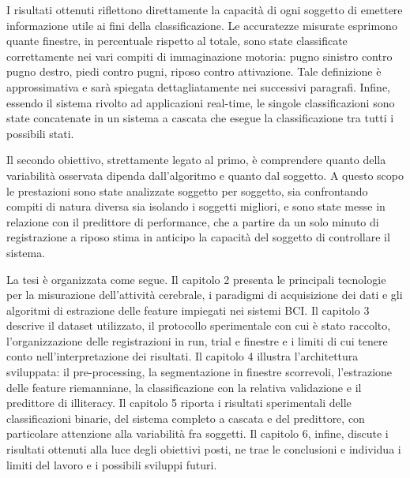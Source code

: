 I risultati ottenuti riflettono direttamente la capacità di ogni soggetto di emettere informazione utile ai fini della classificazione. Le accuratezze misurate esprimono quante finestre, in percentuale rispetto al totale, sono state classificate correttamente nei vari compiti di immaginazione motoria: pugno sinistro contro pugno destro, piedi contro pugni, riposo contro attivazione. Tale definizione è approssimativa e sarà spiegata dettagliatamente nei successivi paragrafi. Infine, essendo il sistema rivolto ad applicazioni real-time, le singole classificazioni sono state concatenate in un sistema a cascata che esegue la classificazione tra tutti i possibili stati.

Il secondo obiettivo, strettamente legato al primo, è comprendere quanto della variabilità osservata dipenda dall'algoritmo e quanto dal soggetto. A questo scopo le prestazioni sono state analizzate soggetto per soggetto, sia confrontando compiti di natura diversa sia isolando i soggetti migliori, e sono state messe in relazione con il predittore di performance, che a partire da un solo minuto di registrazione a riposo stima in anticipo la capacità del soggetto di controllare il sistema.

La tesi è organizzata come segue. Il capitolo 2 presenta le principali tecnologie per la misurazione dell'attività cerebrale, i paradigmi di acquisizione dei dati e gli algoritmi di estrazione delle feature impiegati nei sistemi BCI. Il capitolo 3 descrive il dataset utilizzato, il protocollo sperimentale con cui è stato raccolto, l'organizzazione delle registrazioni in run, trial e finestre e i limiti di cui tenere conto nell'interpretazione dei risultati. Il capitolo 4 illustra l'architettura sviluppata: il pre-processing, la segmentazione in finestre scorrevoli, l'estrazione delle feature riemanniane, la classificazione con la relativa validazione e il predittore di illiteracy. Il capitolo 5 riporta i risultati sperimentali delle classificazioni binarie, del sistema completo a cascata e del predittore, con particolare attenzione alla variabilità fra soggetti. Il capitolo 6, infine, discute i risultati ottenuti alla luce degli obiettivi posti, ne trae le conclusioni e individua i limiti del lavoro e i possibili sviluppi futuri.
